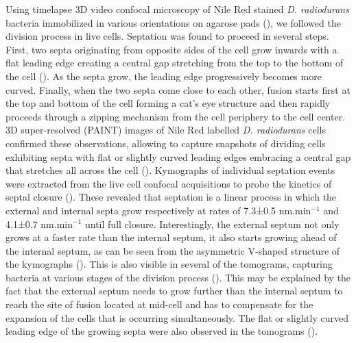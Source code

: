 Using timelapse 3D video confocal microscopy of Nile Red stained \textit{D. radiodurans} bacteria immobilized in various orientations on agarose pads (), we followed the division process in live cells.
Septation was found to proceed in several steps.
First, two septa originating from opposite sides of the cell grow inwards with a flat leading edge creating a central gap stretching from the top to the bottom of the cell ().
As the septa grow, the leading edge progressively becomes more curved.
Finally, when the two septa come close to each other, fusion starts first at the top and bottom of the cell forming a cat's eye structure and then rapidly proceeds through a zipping mechanism from the cell periphery to the cell center.
3D super-resolved (PAINT) images of Nile Red labelled \textit{D. radiodurans} cells confirmed these observations, allowing to capture snapshots of dividing cells exhibiting septa with flat or slightly curved leading edges embracing a central gap that stretches all across the cell ().
Kymographs of individual septation events were extracted from the live cell confocal acquisitions to probe the kinetics of septal closure ().
These revealed that septation is a linear process in which the external and internal septa grow respectively at rates of 7.3±0.5 nm.min$^{-1}$  and 4.1±0.7 nm.min$^{-1}$ until full closure.
Interestingly, the external septum not only grows at a faster rate than the internal septum, it also starts growing ahead of the internal septum, as can be seen from the asymmetric V-shaped structure of the kymographs ().
This is also visible in several of the tomograms, capturing bacteria at various stages of the division process ().
This may be explained by the fact that the external septum needs to grow further than the internal septum to reach the site of fusion located at mid-cell and has to compensate for the expansion of the cells that is occurring simultaneously.
The flat or slightly curved leading edge of the growing septa were also observed in the tomograms ().

